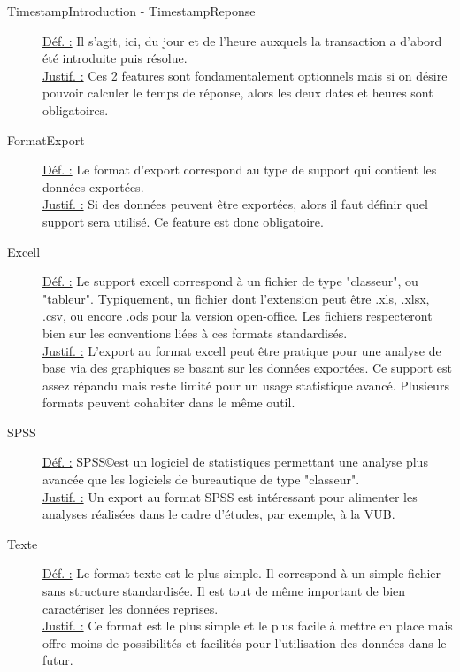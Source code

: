 \begin{description}
\item [TimestampIntroduction - TimestampReponse]
\underline{Déf. :}  Il s'agit,  ici,  du jour et de l'heure auxquels la transaction a d'abord été introduite puis résolue.
\\ \underline{Justif. :}  Ces 2 features sont fondamentalement optionnels mais si on désire pouvoir calculer le temps de réponse,  alors les deux dates et heures sont obligatoires.
\newline

\item [FormatExport]
\underline{Déf. :}  Le format d'export correspond au type de support qui contient les données exportées.
\\ \underline{Justif. :}  Si des données peuvent être exportées,  alors il faut définir quel support sera utilisé.  Ce feature est donc obligatoire.
\newline

\item [Excell]
\underline{Déf. :}  Le support excell correspond à un fichier de type "classeur",  ou "tableur".  Typiquement,  un fichier dont l'extension peut être .xls,  .xlsx,  .csv,  ou encore .ods pour la version open-office.  Les fichiers respecteront bien sur les conventions liées à ces formats standardisés.
\\ \underline{Justif. :}  L'export au format excell peut être pratique pour une analyse de base via des graphiques se basant sur les données exportées.  Ce support est assez répandu mais reste limité pour un usage statistique avancé.   Plusieurs formats peuvent cohabiter dans le même outil.
\newline

\item [SPSS]
\underline{Déf. :}  SPSS\copyright est un logiciel de statistiques permettant une analyse plus avancée que les logiciels de bureautique de type "classeur".
\\ \underline{Justif. :}  Un export au format SPSS est intéressant pour alimenter les analyses réalisées dans le cadre d'études,  par exemple,  à la VUB.
\newline

\item [Texte]
\underline{Déf. :}  Le format texte est le plus simple.  Il correspond à un simple fichier sans structure standardisée.   Il est tout de même important de bien caractériser les données reprises.
\\ \underline{Justif. :}  Ce format est le plus simple et le plus facile à mettre en place mais offre moins de possibilités et facilités pour l'utilisation des données dans le futur.
\newline


\end{description}
